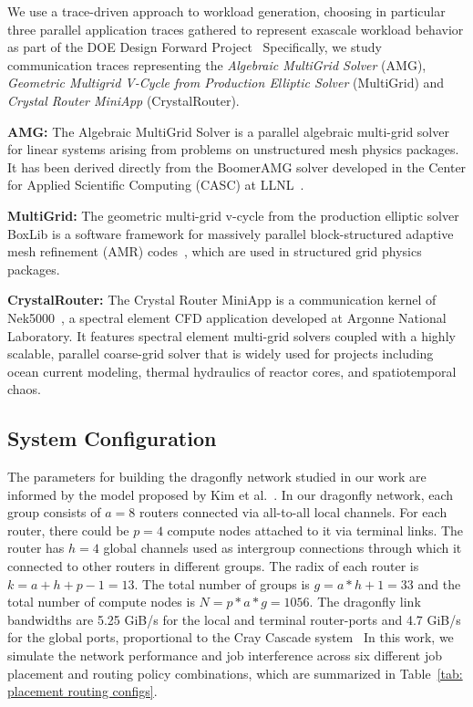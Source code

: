 We use a trace-driven approach to workload generation, choosing in particular three parallel application traces gathered to represent exascale workload behavior as part of the DOE Design Forward Project~\cite{designforward-webpage,designforward-traces} Specifically, we study communication traces representing the \emph{Algebraic MultiGrid Solver} (AMG), \emph{Geometric Multigrid V-Cycle from Production Elliptic Solver} (MultiGrid) and \emph{Crystal Router MiniApp} (CrystalRouter).

\textbf{AMG:} The Algebraic MultiGrid Solver is a parallel algebraic multi-grid solver for linear systems arising from problems on unstructured mesh physics packages. It has been derived directly from the BoomerAMG solver developed in the Center for Applied Scientific Computing (CASC) at LLNL~\cite{amg}. 


\textbf{MultiGrid:} The geometric multi-grid v-cycle from the production elliptic solver BoxLib is a software framework for massively parallel block-structured adaptive mesh refinement (AMR) codes~\cite{boxlib}, which are used in structured grid physics packages. 

\textbf{CrystalRouter:} The Crystal Router MiniApp is a communication kernel of Nek5000~\cite{nek5000}, a spectral element CFD application developed at Argonne National Laboratory. It features spectral element multi-grid solvers coupled with a highly scalable, parallel coarse-grid solver that is widely used for projects including ocean current modeling, thermal hydraulics of reactor cores, and spatiotemporal chaos. 




\subsection{System Configuration}
\label{sec: simulation configuration}

The parameters for building the dragonfly network studied in our work are informed by the model proposed by Kim et al.~\cite{kim-micro}. 
In our dragonfly network, each group consists of $a = 8$ routers connected via all-to-all local channels. For each router, there could be $p = 4$ compute nodes attached to it via terminal links. The router has $h = 4$ global channels used as intergroup connections through which it connected to other routers in different groups. The radix of each router is $k = a+h+p-1 = 13$. 
The total number of groups is $g = a*h+1 = 33 $ and the total number of compute nodes is $N = p*a*g = 1056$. 
The dragonfly link bandwidths are 5.25 GiB/s for the local and terminal router-ports and 4.7 GiB/s for the global ports, proportional to the Cray Cascade system~\cite{faanes} 
In this work, we simulate the network performance and job interference across six different job placement and routing policy combinations, which are summarized in Table~\ref{tab: placement routing configs}.

